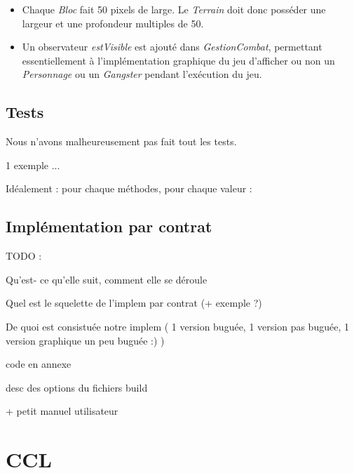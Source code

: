 \documentclass[a4paper, 11pt, notitlepage]{article}
\begin{document}
\begin{itemize}
\item Chaque \emph{Bloc} fait 50 pixels de large. Le \emph{Terrain} doit donc posséder une largeur et une profondeur multiples de 50. \\

\item Un observateur \emph{estVisible} est ajouté dans \emph{GestionCombat}, permettant essentiellement à l'implémentation graphique du jeu d'afficher ou non un \emph{Personnage} ou un \emph{Gangster} pendant l'exécution du jeu.

\end{itemize}

\subsection{Tests}
Nous n'avons malheureusement pas fait tout les tests.

1 exemple ... 

Idéalement : pour chaque méthodes, pour chaque valeur : 

\subsection{Implémentation par contrat}

TODO : 

Qu'est- ce qu'elle suit, comment elle se déroule

Quel est le squelette de l'implem par contrat (+ exemple ?)

De quoi est consistuée notre implem ( 1 version buguée, 1 version pas buguée, 1 version graphique un peu buguée :) )

code en annexe 

desc des options du fichiers build 

+ petit manuel utilisateur 



\section*{CCL}

























\newpage
\pagestyle{empty}


\newpage
\pagestyle{empty}

\end{document}

